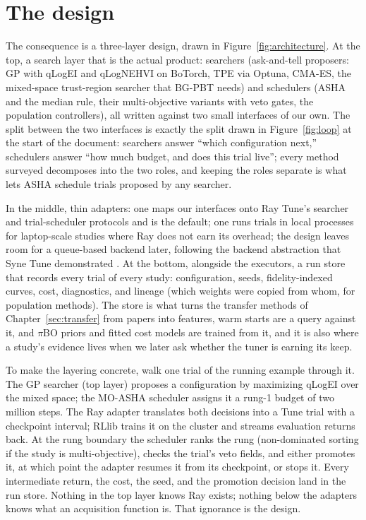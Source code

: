 \section{The design}

The consequence is a three-layer design, drawn in
Figure~\ref{fig:architecture}. At the top, a search layer that is the
actual product: searchers (ask-and-tell proposers: GP with qLogEI and
qLogNEHVI on BoTorch, TPE via Optuna, CMA-ES, the mixed-space
trust-region searcher that BG-PBT needs) and schedulers (ASHA and the
median rule, their multi-objective variants with veto gates, the
population controllers), all written against two small interfaces of our
own. The split between the two interfaces is exactly the split drawn in
Figure~\ref{fig:loop} at the start of the document: searchers answer
``which configuration next,'' schedulers answer ``how much budget, and
does this trial live''; every method surveyed decomposes into the two
roles, and keeping the roles separate is what lets ASHA schedule trials
proposed by any searcher.

In the middle, thin adapters: one maps our interfaces onto Ray Tune's
searcher and trial-scheduler protocols and is the default; one runs
trials in local processes for laptop-scale studies where Ray does not
earn its overhead; the design leaves room for a queue-based backend
later, following the backend abstraction that Syne Tune demonstrated
\citep{salinas2022synetune}. At the bottom, alongside the executors, a
run store that records every trial of every study: configuration, seeds,
fidelity-indexed curves, cost, diagnostics, and lineage (which weights
were copied from whom, for population methods). The store is what turns
the transfer methods of Chapter~\ref{sec:transfer} from papers into
features, warm starts are a query against it, and $\pi$BO priors and
fitted cost models are trained from it, and it is also where a study's
evidence lives when we later ask whether the tuner is earning its keep.

To make the layering concrete, walk one trial of the running example
through it. The GP searcher (top layer) proposes a configuration by
maximizing qLogEI over the mixed space; the MO-ASHA scheduler assigns it
a rung-1 budget of two million steps. The Ray adapter translates both
decisions into a Tune trial with a checkpoint interval; RLlib trains it
on the cluster and streams evaluation returns back. At the rung
boundary the scheduler ranks the rung (non-dominated sorting if the
study is multi-objective), checks the trial's veto fields, and either
promotes it, at which point the adapter resumes it from its checkpoint,
or stops it. Every intermediate return, the cost, the seed, and the
promotion decision land in the run store. Nothing in the top layer knows
Ray exists; nothing below the adapters knows what an acquisition
function is. That ignorance is the design.

